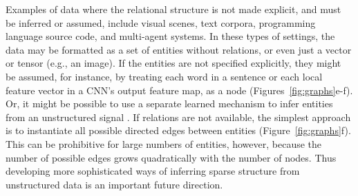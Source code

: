 Examples of data where the relational structure is not made explicit, and must be inferred or assumed, include visual scenes, text corpora, programming language source code, and multi-agent systems. In these types of settings, the data may be formatted as a set of entities without relations, or even just a vector or tensor (e.g., an image). If the entities are not specified explicitly, they might be assumed, for instance, by treating each word in a sentence \citep{vaswani2017attention} or each local feature vector in a CNN's output feature map, as a node \citep{watters2017visual,santoro2017simple,wang2017non} (Figures~\ref{fig:graphs}e-f). Or, it might be possible to use a separate learned mechanism to infer entities from an unstructured signal \citep{luong2015effective,mnih2014recurrent,eslami2016attend,van2018relational}.
%
If relations are not available, the simplest approach is to instantiate all possible directed edges between entities (Figure~\ref{fig:graphs}f). This can be prohibitive for large numbers of entities, however, because the number of possible edges grows quadratically with the number of nodes.
%
Thus developing more sophisticated ways of inferring sparse structure from  unstructured data \citep{kipf2018neural} is an important future direction.

